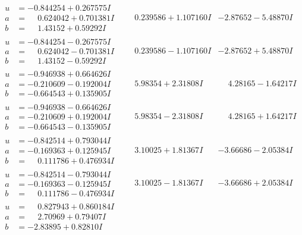 \documentclass[1p]{elsarticle_modified}
\theoremstyle{definition}
\begin{document}
$$\begin{array}{c|c|c}
\begin{aligned}
u &= -0.844254 + 0.267575 I \\
a &= \phantom{-}0.624042 + 0.701381 I \\
b &= \phantom{-}1.43152 + 0.59292 I\end{aligned}
 & \phantom{-}0.239586 + 1.107160 I & -2.87652 - 5.48870 I \\ \hline\begin{aligned}
u &= -0.844254 - 0.267575 I \\
a &= \phantom{-}0.624042 - 0.701381 I \\
b &= \phantom{-}1.43152 - 0.59292 I\end{aligned}
 & \phantom{-}0.239586 - 1.107160 I & -2.87652 + 5.48870 I \\ \hline\begin{aligned}
u &= -0.946938 + 0.664626 I \\
a &= -0.210609 - 0.192004 I \\
b &= -0.664543 + 0.135905 I\end{aligned}
 & \phantom{-}5.98354 + 2.31808 I & \phantom{-}4.28165 - 1.64217 I \\ \hline\begin{aligned}
u &= -0.946938 - 0.664626 I \\
a &= -0.210609 + 0.192004 I \\
b &= -0.664543 - 0.135905 I\end{aligned}
 & \phantom{-}5.98354 - 2.31808 I & \phantom{-}4.28165 + 1.64217 I \\ \hline\begin{aligned}
u &= -0.842514 + 0.793044 I \\
a &= -0.169363 + 0.125945 I \\
b &= \phantom{-}0.111786 + 0.476934 I\end{aligned}
 & \phantom{-}3.10025 + 1.81367 I & -3.66686 - 2.05384 I \\ \hline\begin{aligned}
u &= -0.842514 - 0.793044 I \\
a &= -0.169363 - 0.125945 I \\
b &= \phantom{-}0.111786 - 0.476934 I\end{aligned}
 & \phantom{-}3.10025 - 1.81367 I & -3.66686 + 2.05384 I \\ \hline\begin{aligned}
u &= \phantom{-}0.827943 + 0.860184 I \\
a &= \phantom{-}2.70969 + 0.79407 I \\
b &= -2.83895 + 0.82810 I\end{aligned}

\end{array}$$
\end{document}
